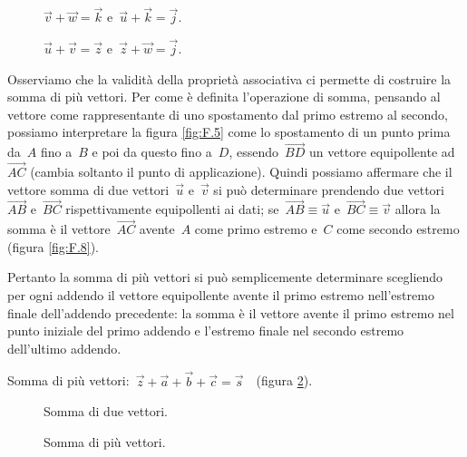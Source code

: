 \begin{figure}[t]
\begin{minipage}{.45\textwidth}
 \centering
 
 \caption{$\vec{v}+\vec{w}=\vec{k}$ e~$\vec{u}+\vec{k}=\vec{j}$.}
 \label{fig:F.6}
\end{minipage}\hfil
\begin{minipage}{.45\textwidth}
 \centering
 
 \caption{$\vec{u}+\vec{v}=\vec{z}$ e~$\vec{z}+\vec{w}=\vec{j}$.}
 \label{fig:F.7}
\end{minipage}
\end{figure}

Osserviamo che la validità della proprietà associativa ci permette di costruire la somma di più vettori. Per come è definita l'operazione di somma, pensando al
vettore come rappresentante di uno spostamento dal primo estremo al secondo, possiamo interpretare la figura \ref{fig:F.5} come lo spostamento di un punto prima
da~$A$ fino a~$B$ e poi da questo fino a~$D$, essendo~$\overrightarrow{BD}$ un vettore equipollente ad~$\overrightarrow{AC}$ (cambia soltanto il punto di applicazione). Quindi possiamo affermare che il vettore somma
di due vettori~$\vec{u}$ e~$\vec{v}$ si può determinare prendendo due vettori~$\overrightarrow{AB}$ e~$\overrightarrow{BC}$ rispettivamente equipollenti
ai dati; se~$\overrightarrow{AB} \equiv \vec{u}$ e~$\overrightarrow{BC} \equiv \vec{v}$ allora la somma è il vettore~$\overrightarrow{AC}$ avente~$A$
come primo estremo e~$C$
come secondo estremo (figura \ref{fig:F.8}).

Pertanto la somma di più vettori si può semplicemente determinare scegliendo per ogni addendo il vettore equipollente avente il primo estremo nell'estremo finale
dell'addendo precedente: la somma è il vettore avente il primo estremo nel punto iniziale del primo addendo e l'estremo finale nel secondo estremo dell'ultimo addendo.
\begin{exrig}
\begin{esempio}
Somma di più vettori:~$\vec{z}+\vec{a}+\vec{b}+\vec{c}=\vec{s}$~~(figura \ref{fig:F.9}).
\end{esempio}
\end{exrig}

\begin{figure}[hb]
\begin{minipage}[t]{.45\textwidth}
 \centering
 
 \caption{Somma di due vettori.}
 \label{fig:F.8}
\end{minipage}\hfil
\begin{minipage}[t]{.45\textwidth}
 \centering
 
 \caption{Somma di più vettori.}
 \label{fig:F.9}
\end{minipage}
\end{figure}


